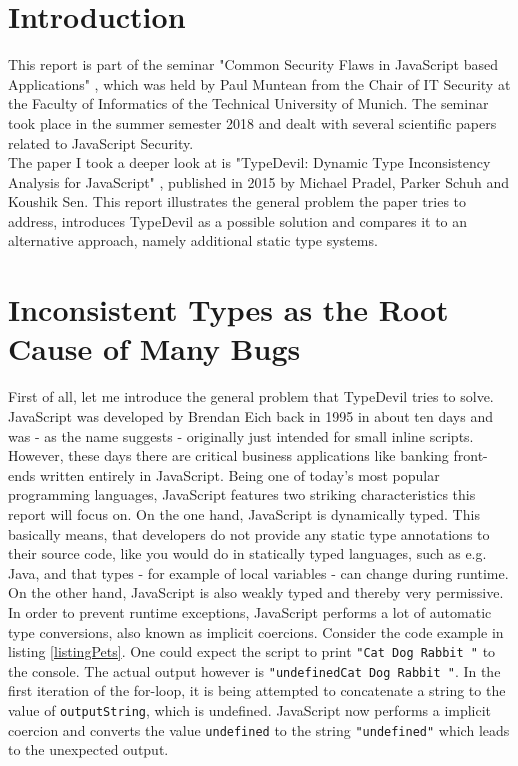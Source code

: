 \documentclass[runningheads,a4paper]{llncs}
\begin{document}
    \newpage

\setcounter{tocdepth}{2}
\tableofcontents
\newpage
\lstlistoflistings %
\newpage

\section{Introduction}

This report is part of the seminar "Common Security Flaws in JavaScript based Applications" \cite{CommonSecFlaws}, which was held by Paul Muntean from the Chair of IT Security at the Faculty of Informatics of the Technical University of Munich.
The seminar took place in the summer semester 2018 and dealt with several scientific papers related to JavaScript Security. \\
The paper I took a deeper look at is "TypeDevil: Dynamic Type Inconsistency Analysis for JavaScript" \cite{DBLP:conf/icse/PradelSS15}, published in 2015 by Michael Pradel, Parker Schuh and Koushik Sen.
This report illustrates the general problem the paper tries to address, introduces TypeDevil as a possible solution and compares it to an alternative approach, namely additional static type systems. 

\section{Inconsistent Types as the Root Cause of Many Bugs}
First of all, let me introduce the general problem that TypeDevil tries to solve. \\
JavaScript was developed by Brendan Eich back in 1995 in about ten days and was - as the name suggests - originally just intended for small inline scripts.
However, these days there are critical business applications like banking front-ends written entirely in JavaScript. 
Being one of today's most popular programming languages, JavaScript features two striking characteristics this report will focus on. 
On the one hand, JavaScript is dynamically typed. 
This basically means, that developers do not provide any static type annotations to their source code, like you would do in statically typed languages, such as e.g. Java, and that types - for example of local variables - can change during runtime.
On the other hand, JavaScript is also weakly typed and thereby very permissive. In order to prevent runtime exceptions, JavaScript performs a lot of automatic type conversions, also known as implicit coercions.
Consider the code example in listing \ref{listingPets}. 
One could expect the script to print \lstinline[columns=fixed]{"Cat Dog Rabbit "} to the console.
The actual output however is \lstinline[columns=fixed]{"undefinedCat Dog Rabbit "}. 
In the first iteration of the for-loop, it is being attempted to concatenate a string to the value of \lstinline[columns=fixed]{outputString}, which is undefined. 
JavaScript now performs a implicit coercion and converts the value \lstinline[columns=fixed]{undefined} to the string \lstinline[columns=fixed]{"undefined"} which leads to the unexpected output.
\end{document}
